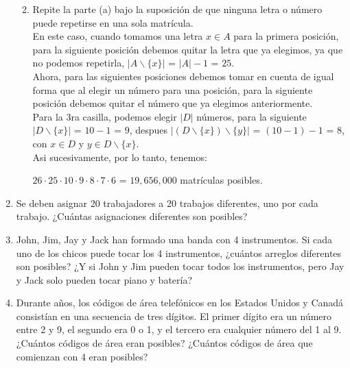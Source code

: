 \documentclass{article}
\begin{document}
\begin{enumerate}
\begin{enumerate}
\begin{center}
				\end{center} $ $\\

			\item Repite la parte (a) bajo la suposición de que ninguna letra o número puede repetirse en una sola matrícula. \\

				En este caso, cuando tomamos una letra $x\in A$ para la primera posici\'on, para la siguiente posici\'on debemos quitar la letra que ya elegimos, ya que no podemos repetirla, $|A \backslash \{ x \}|$ = $|A| - 1$ = $25$. \\
				
				Ahora, para las siguientes posiciones debemos tomar en cuenta de igual forma que al elegir un n\'umero para una posici\'on, para la siguiente posici\'on debemos quitar el n\'umero que ya elegimos anteriormente. \\

				Para la 3ra casilla, podemos elegir $|D|$ n\'umeros, para la siguiente $|D \backslash \{ x \}|$ = $10 - 1$ = $9$, despues $|(D \backslash \{ x \}) \backslash \{ y \}|$ = $(10 - 1) - 1$ = $8$, con $x \in D$ y $y \in D \backslash \{ x \} $.\\
				
				Asi sucesivamente, por lo tanto, tenemos: 
				\begin{center}
					$26 \cdot 25 \cdot 10 \cdot 9 \cdot 8 \cdot 7 \cdot 6$ = $19,656,000$ matr\'iculas posibles.
				\end{center}

		\end{enumerate}

    \item Se deben asignar 20 trabajadores a 20 trabajos diferentes, uno por cada trabajo. ¿Cuántas asignaciones diferentes son posibles?

    \item John, Jim, Jay y Jack han formado una banda con 4 instrumentos. Si cada uno de los chicos puede tocar los 4 instrumentos, ¿cuántos arreglos diferentes son posibles? ¿Y si John y Jim pueden tocar todos los instrumentos, pero Jay y Jack solo pueden tocar piano y batería?

    \item Durante años, los códigos de área telefónicos en los Estados Unidos y Canadá consistían en una secuencia de tres dígitos. El primer dígito era un número entre 2 y 9, el segundo era 0 o 1, y el tercero era cualquier número del 1 al 9. ¿Cuántos códigos de área eran posibles? ¿Cuántos códigos de área que comienzan con 4 eran posibles?


\end{enumerate}
\end{document}

